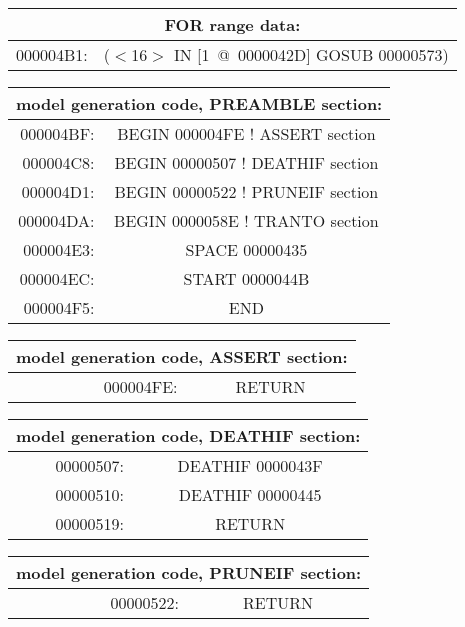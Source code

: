 \begin{center}\begin{tabular}{|r|c|}
\hline
\multicolumn{2}{|c|}{FOR range data:} \\
\hline
000004B1: &  ($<$16$>$ IN [1~@~0000042D] GOSUB 00000573) \\
\hline
\end{tabular}\end{center}
\begin{center}\begin{tabular}{|r|c|}
\hline
\multicolumn{2}{|c|}{model generation code, PREAMBLE section:} \\
\hline
000004BF: & BEGIN 000004FE ! ASSERT section \\
000004C8: & BEGIN 00000507 ! DEATHIF section \\
000004D1: & BEGIN 00000522 ! PRUNEIF section \\
000004DA: & BEGIN 0000058E ! TRANTO section \\
000004E3: & SPACE 00000435 \\
000004EC: & START 0000044B \\
000004F5: & END \\
\hline
\end{tabular}\end{center}
\begin{center}\begin{tabular}{|r|c|}
\hline
\multicolumn{2}{|c|}{model generation code, ASSERT section:} \\
\hline
000004FE: & RETURN \\
\hline
\end{tabular}\end{center}
\begin{center}\begin{tabular}{|r|c|}
\hline
\multicolumn{2}{|c|}{model generation code, DEATHIF section:} \\
\hline
00000507: & DEATHIF 0000043F \\
00000510: & DEATHIF 00000445 \\
00000519: & RETURN \\
\hline
\end{tabular}\end{center}
\begin{center}\begin{tabular}{|r|c|}
\hline
\multicolumn{2}{|c|}{model generation code, PRUNEIF section:} \\
\hline
00000522: & RETURN \\
\hline
\end{tabular}\end{center}

